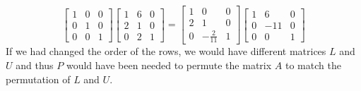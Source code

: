 \documentclass[12pt]{article}
\begin{document}
$$
\begin{bmatrix}
1 & 0 & 0\\
0 & 1 & 0 \\
0 & 0 & 1 
\end{bmatrix}
\begin{bmatrix}
1 & 6 & 0\\
2 & 1 & 0 \\
0 & 2 & 1 
\end{bmatrix}
=
\begin{bmatrix}
1 & 0 & 0\\
2 & 1 & 0 \\
0 & -\frac{2}{11} & 1 
\end{bmatrix}
\begin{bmatrix}
1 & 6 & 0\\
0 & -11 & 0 \\
0 & 0 & 1 
\end{bmatrix}
$$
If we had changed the order of the rows, we would have different matrices $L$ and $U$ and thus $P$ would have been needed to permute the matrix $A$ to match the permutation of $L$ and $U$.
\end{document}
